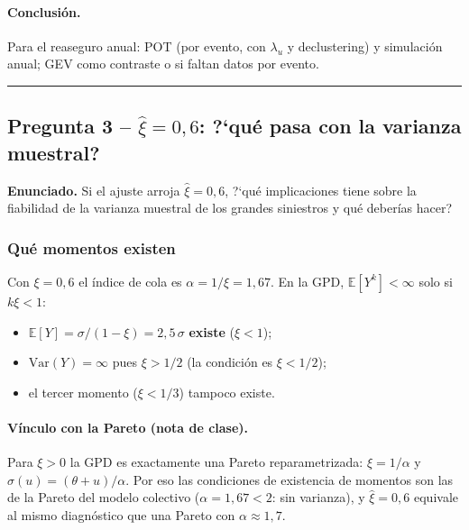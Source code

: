 \documentclass[a4paper,12pt]{article}
\newcommand{\E}{\mathbb{E}}
\newcommand{\Var}{\mathrm{Var}}
\begin{document}
\paragraph{Conclusi\'on.} Para el reaseguro anual: POT (por evento, con $\lambda_u$ y declustering) y simulaci\'on anual; GEV como contraste o si faltan datos por evento.

\bigskip\hrule\bigskip

\subsection{Pregunta 3 -- $\hat\xi=0{,}6$: ?`qu\'e pasa con la varianza muestral?}

\noindent\textbf{Enunciado.} Si el ajuste arroja $\hat\xi=0{,}6$, ?`qu\'e implicaciones tiene sobre la fiabilidad de la varianza muestral de los grandes siniestros y qu\'e deber\'ias hacer?

\subsubsection*{Qu\'e momentos existen}
Con $\xi=0{,}6$ el \'indice de cola es $\alpha=1/\xi=1{,}67$. En la GPD, $\E[Y^k]<\infty$ solo si $k\xi<1$:
\begin{itemize}[leftmargin=*,itemsep=1pt]
\item $\E[Y]=\sigma/(1-\xi)=2{,}5\,\sigma$ \textbf{existe} ($\xi<1$);
\item $\Var(Y)=\infty$ pues $\xi>1/2$ (la condici\'on es $\xi<1/2$);
\item el tercer momento ($\xi<1/3$) tampoco existe.
\end{itemize}

\paragraph{V\'inculo con la Pareto (nota de clase).} Para $\xi>0$ la GPD es exactamente una Pareto reparametrizada: $\xi=1/\alpha$ y $\sigma(u)=(\theta+u)/\alpha$. Por eso las condiciones de existencia de momentos son las de la Pareto del modelo colectivo ($\alpha=1{,}67<2$: sin varianza), y $\hat\xi=0{,}6$ equivale al mismo diagn\'ostico que una Pareto con $\alpha\approx1{,}7$.
\end{document}
